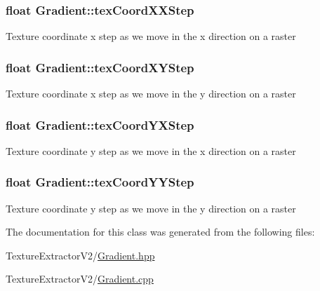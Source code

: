 \subsubsection[{tex\+Coord\+X\+X\+Step}]{\setlength{\rightskip}{0pt plus 5cm}float Gradient\+::tex\+Coord\+X\+X\+Step}\label{class_gradient_a624a5bc1117ef0ff5586505bd7414b00}
Texture coordinate x step as we move in the x direction on a raster \hypertarget{class_gradient_a8afadd4049d8b9eb22cbc400e70560aa}{}
\subsubsection[{tex\+Coord\+X\+Y\+Step}]{\setlength{\rightskip}{0pt plus 5cm}float Gradient\+::tex\+Coord\+X\+Y\+Step}\label{class_gradient_a8afadd4049d8b9eb22cbc400e70560aa}
Texture coordinate x step as we move in the y direction on a raster \hypertarget{class_gradient_a81d975aa437d9aa2d4f4902073c1f529}{}
\subsubsection[{tex\+Coord\+Y\+X\+Step}]{\setlength{\rightskip}{0pt plus 5cm}float Gradient\+::tex\+Coord\+Y\+X\+Step}\label{class_gradient_a81d975aa437d9aa2d4f4902073c1f529}
Texture coordinate y step as we move in the x direction on a raster \hypertarget{class_gradient_a7d935258d173da77270987a4c95f3462}{}
\subsubsection[{tex\+Coord\+Y\+Y\+Step}]{\setlength{\rightskip}{0pt plus 5cm}float Gradient\+::tex\+Coord\+Y\+Y\+Step}\label{class_gradient_a7d935258d173da77270987a4c95f3462}
Texture coordinate y step as we move in the y direction on a raster 

The documentation for this class was generated from the following files\+:\begin{DoxyCompactItemize}
\item 
Texture\+Extractor\+V2/\hyperlink{_gradient_8hpp}{Gradient.\+hpp}\item 
Texture\+Extractor\+V2/\hyperlink{_gradient_8cpp}{Gradient.\+cpp}\end{DoxyCompactItemize}
